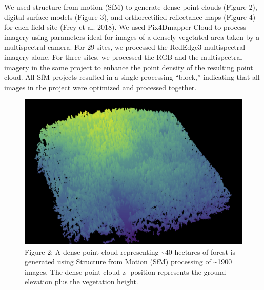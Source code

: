 \documentclass[]{article}
\begin{document}
We used structure from motion (SfM) to generate dense point clouds
(Figure 2), digital surface models (Figure 3), and orthorectified
reflectance maps (Figure 4) for each field site (Frey et al. 2018). We
used Pix4Dmapper Cloud to process imagery using parameters ideal for
images of a densely vegetated area taken by a multispectral camera. For
29 sites, we processed the RedEdge3 multispectral imagery alone. For
three sites, we processed the RGB and the multispectral imagery in the
same project to enhance the point density of the resulting point cloud.
All SfM projects resulted in a single processing ``block,'' indicating
that all images in the project were optimized and processed together.

\begin{figure}
\centering
\includegraphics{../../figures/eldo_3k_3_point_cloud.png}
\caption{Figure 2: A dense point cloud representing \textasciitilde{}40
hectares of forest is generated using Structure from Motion (SfM)
processing of \textasciitilde{}1900 images. The dense point cloud z-
position represents the ground elevation plus the vegetation height.}
\end{figure}
\end{document}
